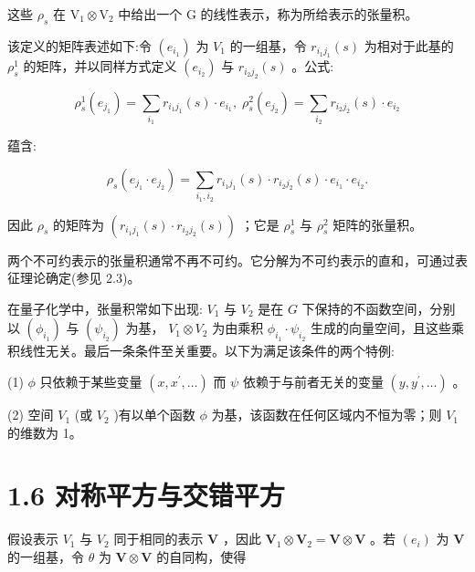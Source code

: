 \documentclass[10pt]{article}
\begin{document}
这些 \({\rho }_{s}\) 在 \({\mathrm{V}}_{1} \otimes  {\mathrm{V}}_{2}\) 中给出一个 \(\mathrm{G}\) 的线性表示，称为所给表示的张量积。

该定义的矩阵表述如下:令 \(\left( {e}_{{i}_{1}}\right)\) 为 \({V}_{1}\) 的一组基，令 \({r}_{{i}_{1}{j}_{1}}\left( s\right)\) 为相对于此基的 \({\rho }_{s}^{1}\) 的矩阵，并以同样方式定义 \(\left( {e}_{{i}_{2}}\right)\) 与 \({r}_{{i}_{2}{j}_{2}}\left( s\right)\) 。公式:

\[
{\rho }_{s}^{1}\left( {e}_{{j}_{1}}\right)  = \mathop{\sum }\limits_{{i}_{1}}{r}_{{i}_{1}{j}_{1}}\left( s\right)  \cdot  {e}_{{i}_{1}},\;{\rho }_{s}^{2}\left( {e}_{{j}_{2}}\right)  = \mathop{\sum }\limits_{{i}_{2}}{r}_{{i}_{2}{j}_{2}}\left( s\right)  \cdot  {e}_{{i}_{2}}
\]

蕴含:

\[
{\rho }_{s}\left( {{e}_{{j}_{1}} \cdot  {e}_{{j}_{2}}}\right)  = \mathop{\sum }\limits_{{{i}_{1},{i}_{2}}}{r}_{{i}_{1}{j}_{1}}\left( s\right)  \cdot  {r}_{{i}_{2}{j}_{2}}\left( s\right)  \cdot  {e}_{{i}_{1}} \cdot  {e}_{{i}_{2}}.
\]

因此 \({\rho }_{s}\) 的矩阵为 \(\left( {{r}_{{i}_{1}{j}_{1}}\left( s\right)  \cdot  {r}_{{i}_{2}{j}_{2}}\left( s\right) }\right)\) ；它是 \({\rho }_{s}^{1}\) 与 \({\rho }_{s}^{2}\) 矩阵的张量积。

两个不可约表示的张量积通常不再不可约。它分解为不可约表示的直和，可通过表征理论确定(参见 2.3)。

在量子化学中，张量积常如下出现: \({V}_{1}\) 与 \({V}_{2}\) 是在 \(G\) 下保持的不函数空间，分别以 \(\left( {\phi }_{{i}_{1}}\right)\) 与 \(\left( {\psi }_{{i}_{2}}\right)\) 为基， \({V}_{1} \otimes  {V}_{2}\) 为由乘积 \({\phi }_{{i}_{1}} \cdot  {\psi }_{{i}_{2}}\) 生成的向量空间，且这些乘积线性无关。最后一条条件至关重要。以下为满足该条件的两个特例:

(1) \(\phi\) 只依赖于某些变量 \(\left( {x,{x}^{\prime },\ldots }\right)\) 而 \(\psi\) 依赖于与前者无关的变量 \(\left( {y,{y}^{\prime },\ldots }\right)\) 。

(2) 空间 \({V}_{1}\) (或 \({V}_{2}\) )有以单个函数 \(\phi\) 为基，该函数在任何区域内不恒为零；则 \({V}_{1}\) 的维数为 1。

\section*{1.6 对称平方与交错平方}

假设表示 \({V}_{1}\) 与 \({V}_{2}\) 同于相同的表示 \(\mathbf{V}\) ，因此 \({\mathbf{V}}_{1} \otimes  {\mathbf{V}}_{2} = \mathbf{V} \otimes  \mathbf{V}\) 。若 \(\left( {e}_{i}\right)\) 为 \(\mathbf{V}\) 的一组基，令 \(\theta\) 为 \(\mathbf{V} \otimes  \mathbf{V}\) 的自同构，使得
\end{document}
